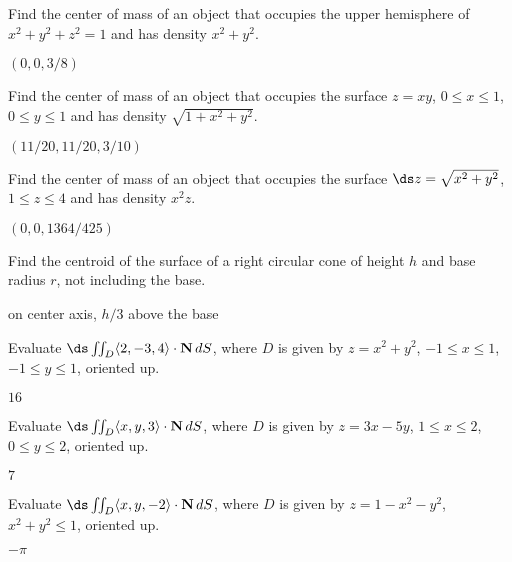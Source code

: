 \begin{enumialphparenastyle}

\begin{ex}
Find the center of mass of an object that occupies the upper
hemisphere of $x^2+y^2+z^2=1$ and has density $x^2+y^2$.
\begin{sol}
	$(0,0,3/8)$
\end{sol}
\end{ex}

\begin{ex}
Find the center of mass of an object that occupies the
surface $z=xy$, $0\le x\le1$, $0\le y\le 1$ and has density $\sqrt{1+x^2+y^2}$.
\begin{sol}
	$(11/20,11/20,3/10)$
\end{sol}
\end{ex}

\begin{ex}
Find the center of mass of an object that occupies the
surface $\ds z=\sqrt{x^2+y^2}$, $1\le z\le4$ and has density $x^2z$.
\begin{sol}
	$(0,0,1364/425)$
\end{sol}
\end{ex}

\begin{ex}
Find the centroid of the surface of a right circular cone of
height $h$ and base radius $r$, not including the base.
\begin{sol}
	on center axis, $h/3$ above the base
\end{sol}
\end{ex}

\begin{ex}
Evaluate $\ds \iint_{D} \langle 2,-3,4\rangle\cdot {\bf
  N}\,dS$, where $D$ is given by $z=x^2+y^2$, $-1\le x\le 1$, $-1\le
y\le 1$, oriented up.
\begin{sol}
	$16$
\end{sol}
\end{ex}

\begin{ex}
Evaluate $\ds \iint_{D} \langle x,y,3\rangle\cdot {\bf
  N}\,dS$, where $D$ is given by $z=3x-5y$, $1\le x\le 2$, $0\le
y\le 2$, oriented up.
\begin{sol}
	$7$
\end{sol}
\end{ex}

\begin{ex}
Evaluate $\ds \iint_{D} \langle x,y,-2\rangle\cdot {\bf
  N}\,dS$, where $D$ is given by $z=1-x^2-y^2$, $x^2+y^2\le1$,
oriented up.
\begin{sol}
	$-\pi$
\end{sol}
\end{ex}


\end{enumialphparenastyle}
